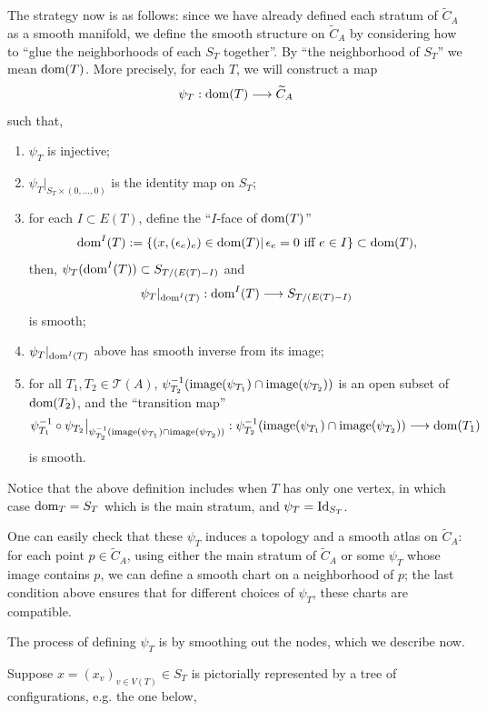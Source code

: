 \documentclass[11pt]{article}
\theoremstyle{definition}
\theoremstyle{remark}
\def\wt#1{\widetilde{#1}}
\def\cT{\mathcal{T}}
\def\dom{{\tn{dom}}}
\def\tn#1{\textnormal{#1}}
\begin{document}
The strategy now is as follows: since we have already defined each stratum of $\wt{C}_A$ as a smooth manifold, we define the smooth structure on $\wt{C}_A$ by considering how to ``glue the neighborhoods of each $S_T$ together''. 
By ``the neighborhood of $S_T$'' we mean $\dom(T)$. 
More precisely, for each $T$, we will construct a map 
$$\psi_T:\dom(T)\longrightarrow \widetilde{C}_A$$
such that, 
\begin{enumerate}
\item \label{psi1_item} $\psi_T$ is injective;

\item \label{psi2_item} $\psi_T|_{S_T\times(0,\ldots,0)}$ is the identity map on $S_T$; 

\item \label{psi3_item} for each $I\subset E(T)$, define the ``$I$-face of $\dom(T)$''
$$\dom^I(T):=\{(x,(\epsilon_e)_e)\in\dom(T) |\,\epsilon_e=0 \tn{ iff } e\in I\}\subset \dom(T),$$
then, 
$\psi_T(\dom^I(T))\subset S_{T/(E(T)-I)}$
and 
$$\psi_T|_{\dom^I(T)}:\dom^I(T)\longrightarrow S_{T/(E(T)-I)}$$
is smooth; 

\item \label{psi4_item} $\psi_T|_{\dom^I(T)}$ above has smooth inverse from its image; 

\item \label{psi5_item} for all $T_1,T_2\in\cT(A)$, $\psi_{T_2}^{-1}(\tn{image}(\psi_{T_1})\cap\tn{image}(\psi_{T_2}))$ is an open subset of $\dom(T_2)$, and the ``transition map'' 
$$\psi_{T_1}^{-1}\circ\psi_{T_2}\big|_{\psi_{T_2}^{-1}(\tn{image}(\psi_{T_1})\cap\tn{image}(\psi_{T_2}))}:\psi_{T_2}^{-1}(\tn{image}(\psi_{T_1})\cap\tn{image}(\psi_{T_2}))\longrightarrow \dom(T_1)$$
is smooth. 
\end{enumerate}

Notice that the above definition includes when $T$ has only one vertex, in which case $\dom_T=S_T$ which is the main stratum, and $\psi_T=\tn{Id}_{S_T}$. 
  
One can easily check that these $\psi_T$ induces a topology and a smooth atlas on $\wt{C}_A$: for each point $p\in\wt{C}_A$, using either the main stratum of $\wt{C}_A$ or some $\psi_T$ whose image contains $p$, we can define a smooth chart on a neighborhood of $p$; the last condition above ensures that for different choices of $\psi_T$, these charts are compatible. 

The process of defining $\psi_T$ is by smoothing out the nodes, which we describe now. 

Suppose $x=(x_v)_{v\in V(T)}\in S_T$ is pictorially represented by a tree of configurations, e.g. the one below, 
\end{document}
